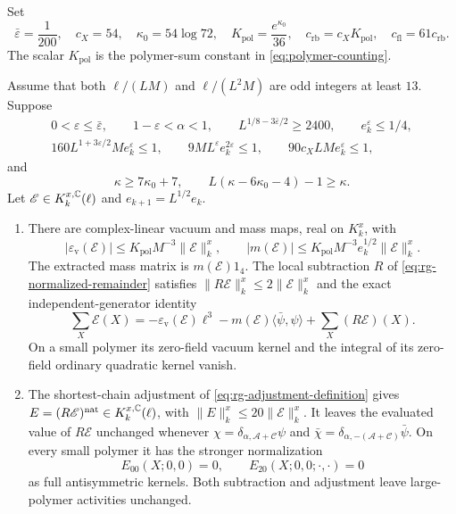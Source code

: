 Set
\[
 \bar\varepsilon=\frac1{200},\quad c_X=54,\quad
 \kappa_0=54\log72,\quad K_{\mathrm{pol}}=\frac{e^{\kappa_0}}{36},\quad
 c_{\mathrm{rb}}=c_XK_{\mathrm{pol}},\quad c_{\mathrm{fl}}=61c_{\mathrm{rb}}.
\]
The scalar $K_{\mathrm{pol}}$ is the polymer-sum constant in
\eqref{eq:polymer-counting}.

\begin{theorem}\label{thm:main}
Assume that both \(\ell/(LM)\) and \(\ell/(L^2M)\) are odd
integers at least \(13\). Suppose
\begin{equation}\label{eq:rg-contraction-parameters}
 \begin{gathered}
 0<\varepsilon\le\bar\varepsilon,\qquad 1-\varepsilon<\alpha<1,
 \qquad L^{1/8-3\bar\varepsilon/2}\ge2400,\qquad e_k^\varepsilon\le1/4,\\
 160L^{1+3\varepsilon/2}Me_k^\varepsilon\le1,\qquad
 9ML^\varepsilon e_k^{2\varepsilon}\le1,\qquad
 90c_XLMe_k^\varepsilon\le1,
 \end{gathered}
\end{equation}
and
\begin{equation}\label{eq:rg-contraction-polymer-parameters}
 \kappa\ge7\kappa_0+7,\qquad
 L(\kappa-6\kappa_0-4)-1\ge\kappa.
\end{equation}
Let \(\mathscr E\in K_k^{x,\mathbb C}(\ell)\) and
\(e_{k+1}=L^{1/2}e_k\).

\begin{enumerate}[label=\textup{(\roman*)},leftmargin=*]
\item There are complex-linear vacuum and mass maps, real on
\(K_k^x\), with
\[
 |\varepsilon_{\mathrm v}(\mathscr E)|
       \le K_{\mathrm{pol}}M^{-3}\|\mathscr E\|_k^x,\qquad
 |m(\mathscr E)|
       \le K_{\mathrm{pol}}M^{-3}e_k^{1/2}\|\mathscr E\|_k^x .
\]
The extracted mass matrix is \(m(\mathscr E)1_4\).
The local subtraction \(R\) of \eqref{eq:rg-normalized-remainder}
satisfies \(\|R\mathscr E\|_k^x\le2\|\mathscr E\|_k^x\) and the
exact independent-generator identity
\[
 \sum_X\mathscr E(X)
 =-\varepsilon_{\mathrm v}(\mathscr E)\ell^3
       -m(\mathscr E)\langle\bar\psi,\psi\rangle
       +\sum_X(R\mathscr E)(X).
\]
On a small polymer its zero-field vacuum kernel and the integral
of its zero-field ordinary quadratic kernel vanish.

\item The shortest-chain adjustment of
\eqref{eq:rg-adjustment-definition} gives
\(E=(R\mathscr E)^{\mathrm{nat}}\in K_k^{x,\mathbb C}(\ell)\), with
\(\|E\|_k^x\le20\|\mathscr E\|_k^x\). It leaves the evaluated
value of \(R\mathscr E\) unchanged whenever
\(\chi=\delta_{\alpha,\mathscr A+\mathscr C}\psi\) and
\(\bar\chi=\delta_{\alpha,-(\mathscr A+\mathscr C)}\bar\psi\).
On every small polymer it has the stronger normalization
\[
 E_{00}(X;0,0)=0,\qquad E_{20}(X;0,0;\cdot,\cdot)=0
\]
as full antisymmetric kernels. Both subtraction and adjustment
leave large-polymer activities unchanged.


\end{enumerate}
\end{theorem}
